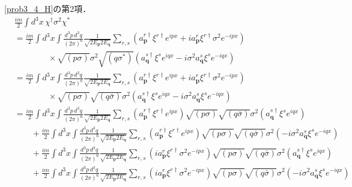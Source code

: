 \eqref{prob3_4_H}の第2項．
\begin{align*}
  & \frac{im}{2}\int d^3x \, \chi^\dagger \sigma^2 \chi^\ast \\
  & = \frac{im}{2}\int d^3x \int \frac{d^3p\, d^3q}{(2\pi)^6} \frac{1}{\sqrt{2E_{\boldsymbol{p}}2E_{\boldsymbol{q}}}}
  \sum_{r, s} \left( a_{\boldsymbol{p}}^{r\dagger} \xi^{r\dagger} e^{ipx} + i a_{\boldsymbol{p}}^{r} \xi^{r\dagger} \sigma^2 e^{-ipx} \right) \\
  & \qquad \qquad \times \sqrt{(p \sigma)} \sigma^2 \sqrt{(q\sigma^\ast)} \left( a_{\boldsymbol{q}}^{s\dagger} \xi^s e^{iqx} - i \sigma^2 a_{\boldsymbol{q}}^{s} \xi^s e^{-iqx} \right) \\
  & = \frac{im}{2}\int d^3x \int \frac{d^3p\, d^3q}{(2\pi)^6} \frac{1}{\sqrt{2E_{\boldsymbol{p}}2E_{\boldsymbol{q}}}}
  \sum_{r, s} \left( a_{\boldsymbol{p}}^{r\dagger} \xi^{r\dagger} e^{ipx} + i a_{\boldsymbol{p}}^{r} \xi^{r\dagger} \sigma^2 e^{-ipx} \right) \\
  & \qquad \qquad \times \sqrt{(p \sigma)} \sqrt{(q\bar\sigma)} \sigma^2 \left( a_{\boldsymbol{q}}^{s\dagger} \xi^s e^{iqx} - i \sigma^2 a_{\boldsymbol{q}}^{s} \xi^s e^{-iqx} \right) \\
  & = \frac{im}{2}\int d^3x \int \frac{d^3p\, d^3q}{(2\pi)^6} \frac{1}{\sqrt{2E_{\boldsymbol{p}}2E_{\boldsymbol{q}}}}
  \sum_{r, s} \left( a_{\boldsymbol{p}}^{r\dagger} \xi^{r\dagger} e^{ipx} \right) \sqrt{(p \sigma)} \sqrt{(q \bar\sigma)} \sigma^2 \left( a_{\boldsymbol{q}}^{s\dagger} \xi^s e^{iqx} \right) \\
  & \qquad + \frac{im}{2}\int d^3x \int \frac{d^3p\, d^3q}{(2\pi)^6} \frac{1}{\sqrt{2E_{\boldsymbol{p}}2E_{\boldsymbol{q}}}}
  \sum_{r, s} \left( a_{\boldsymbol{p}}^{r\dagger} \xi^{r\dagger} e^{ipx} \right) \sqrt{(p \sigma)} \sqrt{(q \bar\sigma)} \sigma^2 \left( - i \sigma^2 a_{\boldsymbol{q}}^{s} \xi^s e^{-iqx} \right) \\
  & \qquad + \frac{im}{2}\int d^3x \int \frac{d^3p\, d^3q}{(2\pi)^6} \frac{1}{\sqrt{2E_{\boldsymbol{p}}2E_{\boldsymbol{q}}}}
  \sum_{r, s} \left( i a_{\boldsymbol{p}}^{r} \xi^{r\dagger} \sigma^2 e^{-ipx} \right) \sqrt{(p \sigma)} \sqrt{(q \bar\sigma)} \sigma^2 \left( a_{\boldsymbol{q}}^{s\dagger} \xi^s e^{iqx} \right) \\
  & \qquad + \frac{im}{2}\int d^3x \int \frac{d^3p\, d^3q}{(2\pi)^6} \frac{1}{\sqrt{2E_{\boldsymbol{p}}2E_{\boldsymbol{q}}}}
  \sum_{r, s} \left( i a_{\boldsymbol{p}}^{r} \xi^{r\dagger} \sigma^2 e^{-ipx} \right) \sqrt{(p \sigma)} \sqrt{(q \bar\sigma)} \sigma^2 \left( - i \sigma^2 a_{\boldsymbol{q}}^{s} \xi^s e^{-iqx} \right) \\

\end{align*}
